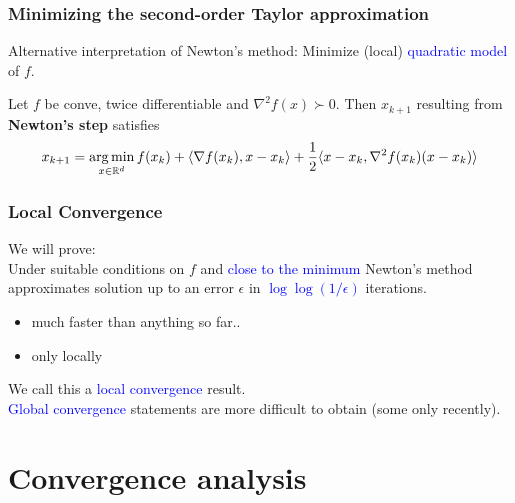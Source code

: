 \documentclass{beamer}
\begin{document}
\begin{frame}
  \frametitle{Minimizing the second-order Taylor approximation}
  Alternative interpretation of Newton's method:
  Minimize (local) \textcolor{blue}{quadratic model} of $f$.
  \begin{lemma}%
    Let $f$ be conve, twice differentiable and $\nabla^2 f(x) \succ 0$. Then $x_{k+1}$ resulting from \textbf{Newton's step} satisfies
    \begin{equation}
      x_{k+1} = \operatorname*{arg\,min}_{x \in \mathbb{R}^d} f(x_k) + \langle \nabla f(x_k), x-x_k \rangle + \frac12 \langle x-x_k, \nabla^2 f(x_k) (x-x_k)  \rangle
    \end{equation}
  \end{lemma}
\end{frame}


\begin{frame}
  \frametitle{Local Convergence}
  We will prove:\\
  Under suitable conditions on $f$ and \textcolor{blue}{close to the minimum} Newton's method approximates solution up to an error $\epsilon$ in \textcolor{blue}{$\log \log (1/\epsilon)$} iterations.
  \begin{itemize}
    \item much faster than anything so far..
    \item only locally
  \end{itemize}
  We call this a \textcolor{blue}{local convergence} result.\\

  \textcolor{blue}{Global convergence} statements are more difficult to obtain (some only recently).
\end{frame}


\section{Convergence analysis}%
\end{document}
